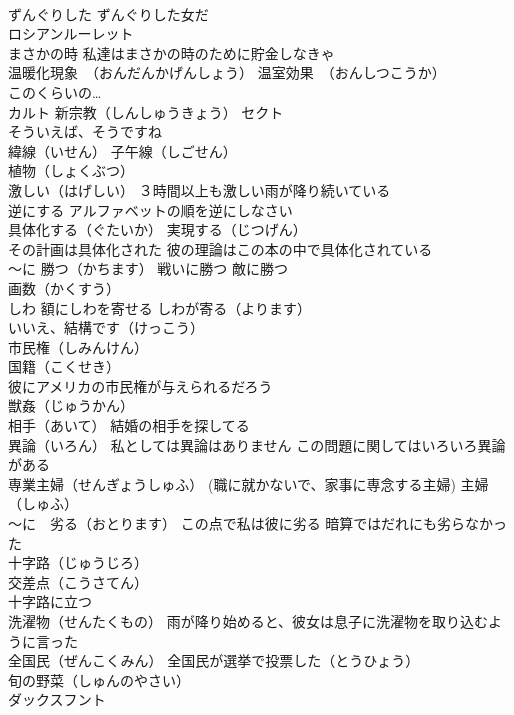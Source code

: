 \documentclass[8pt]{extreport}
\begin{document}
\begin{CJK}{UTF8}{min}
\\	ずんぐりした ずんぐりした女だ
\\	ロシアンルーレット
\\	まさかの時 私達はまさかの時のために貯金しなきゃ
\\	温暖化現象　（おんだんかげんしょう） 温室効果　（おんしつこうか）
\\	このくらいの…
\\	カルト 新宗教（しんしゅうきょう） セクト 
\\	そういえば、そうですね
\\	緯線（いせん） 子午線（しごせん）
\\	植物（しょくぶつ）
\\	激しい（はげしい） ３時間以上も激しい雨が降り続いている
\\	逆にする アルファベットの順を逆にしなさい
\\	具体化する（ぐたいか） 実現する（じつげん） 
\\	その計画は具体化された 彼の理論はこの本の中で具体化されている
\\	～に 勝つ（かちます） 戦いに勝つ 敵に勝つ
\\	画数（かくすう）
\\	しわ 額にしわを寄せる しわが寄る（よります）
\\	いいえ、結構です（けっこう）
\\	市民権（しみんけん）
\\	国籍（こくせき）
\\	彼にアメリカの市民権が与えられるだろう
\\	獣姦（じゅうかん）
\\	相手（あいて） 結婚の相手を探してる
\\	異論（いろん） 私としては異論はありません この問題に関してはいろいろ異論がある
\\	専業主婦（せんぎょうしゅふ） (職に就かないで、家事に専念する主婦) 主婦（しゅふ）
\\	～に　劣る（おとります） この点で私は彼に劣る 暗算ではだれにも劣らなかった
\\	十字路（じゅうじろ） 
\\	交差点（こうさてん） 
\\	十字路に立つ
\\	洗濯物（せんたくもの） 雨が降り始めると、彼女は息子に洗濯物を取り込むように言った
\\	全国民（ぜんこくみん） 全国民が選挙で投票した（とうひょう）
\\	旬の野菜（しゅんのやさい）
\\	ダックスフント 

\end{CJK}
\end{document}
